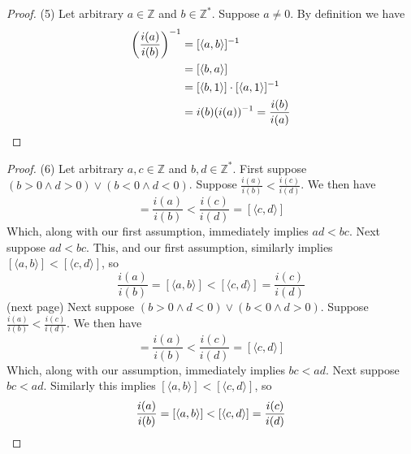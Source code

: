 \documentclass{report}
\begin{document}
\begin{proof}(5)
Let arbitrary $a\in\mathbb Z$ and $b\in\mathbb Z^*$. Suppose $a\neq0$.
By definition we have
\begin{align*}
\left(\frac{i(a)}{i(b)}\right)^{-1}&=[\langle a,b\rangle]^{-1}\\
&=[\langle b,a\rangle]\\
&=[\langle b,1\rangle]\cdot[\langle a,1\rangle]^{-1}\\
&=i(b)(i(a))^{-1}=\frac{i(b)}{i(a)}\qedhere
\end{align*}
\end{proof}
\begin{proof}(6)
Let arbitrary $a,c\in\mathbb Z$ and $b,d\in\mathbb Z^*$.
First suppose $(b>0\land d>0)\lor(b<0\land d<0)$. Suppose 
$\frac{i(a)}{i(b)}<\frac{i(c)}{i(d)}$. We then have
\begin{equation*}
[\langle a,b\rangle]=\frac{i(a)}{i(b)}<\frac{i(c)}{i(d)}=[\langle c,d\rangle]
\end{equation*}
Which, along with our first assumption, immediately implies $ad<bc$. Next suppose $ad<bc$. This, and our first assumption, similarly implies $[\langle a,b\rangle]<[\langle c,d\rangle]$, so 
\begin{equation*}
\frac{i(a)}{i(b)}=[\langle a,b\rangle]<[\langle c,d\rangle]=\frac{i(c)}{i(d)}
\end{equation*}
(next page)\newpage
\indent Next suppose $(b>0\land d<0)\lor(b<0\land d>0)$. Suppose 
$\frac{i(a)}{i(b)}<\frac{i(c)}{i(d)}$. We then have
\begin{equation*}
[\langle a,b\rangle]=\frac{i(a)}{i(b)}<\frac{i(c)}{i(d)}=[\langle c,d\rangle]
\end{equation*}
Which, along with our assumption, immediately implies $bc<ad$. Next suppose $bc<ad$. Similarly this implies $[\langle a,b\rangle]<[\langle c,d\rangle]$, so
\begin{equation*}
\frac{i(a)}{i(b)}=[\langle a,b\rangle]<[\langle c,d\rangle]=\frac{i(c)}{i(d)}\qedhere
\end{equation*}
\newpage


\end{proof}
\end{document}
